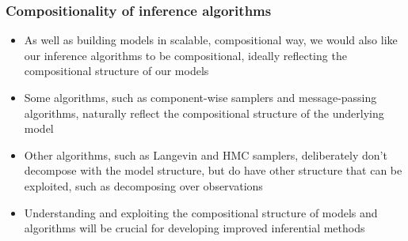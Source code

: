 \documentclass[mathserif,handout]{beamer}
\begin{document}

\begin{frame}
  \frametitle{Compositionality of inference algorithms}
  \begin{itemize}
  \item As well as building models in scalable, compositional way, we would also like our inference algorithms to be compositional, ideally reflecting the compositional structure of our models
  \item Some algorithms, such as component-wise samplers and message-passing algorithms, naturally reflect the compositional structure of the underlying model
  \item Other algorithms, such as Langevin and HMC samplers, deliberately don't decompose with the model structure, but do have other structure that can be exploited, such as decomposing over observations
    \item Understanding and exploiting the compositional structure of models and algorithms will be crucial for developing improved inferential methods
  \end{itemize}
\end{frame}
\end{document}
